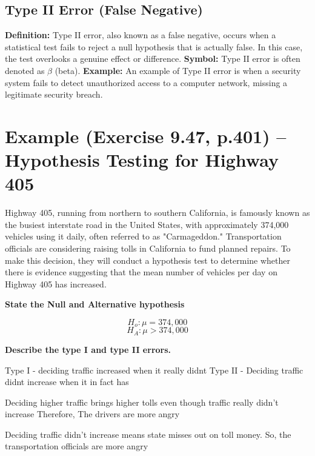 \documentclass{report}
\begin{document}
\subsection{Type II Error (False Negative)}

\vspace{10pt}
\textbf{Definition:} Type II error, also known as a false negative, occurs when a statistical test fails to reject a null hypothesis that is actually false. In this case, the test overlooks a genuine effect or difference.
\bigbreak \noindent
\textbf{Symbol:} Type II error is often denoted as $\beta$ (beta).
\bigbreak \noindent
\textbf{Example:} An example of Type II error is when a security system fails to detect unauthorized access to a computer network, missing a legitimate security breach.
  \bigbreak \noindent

  \pagebreak
\section*{Example (Exercise 9.47, p.401) – Hypothesis Testing for Highway 405}

Highway 405, running from northern to southern California, is famously known as the busiest interstate road in the United States, with approximately 374,000 vehicles using it daily, often referred to as "Carmageddon." Transportation officials are considering raising tolls in California to fund planned repairs. To make this decision, they will conduct a hypothesis test to determine whether there is evidence suggesting that the mean number of vehicles per day on Highway 405 has increased.
\bigbreak \noindent \bigbreak \noindent
\noindent \begin{large}{\textbf{State the Null and Alternative hypothesis}}\end{large}
\bigbreak \noindent
  $$ H_o : \mu = 374,000$$
  $$ H_A : \mu > 374,000$$
  \bigbreak \noindent
  \begin{large}{\textbf{Describe the type I and type II errors.}}\end{large}
  \bigbreak \noindent
  \begin{center}
  Type I - deciding traffic increased when it really didnt
\bigbreak \noindent
  Type II - Deciding traffic didnt increase when it in fact has
\end{center}
\bigbreak \noindent \bigbreak \noindent
\begin{large}{\textbf{If a type I error is committed, who is more angry?}\end{large}
  \bigbreak \noindent
  \begin{center}
  Deciding higher traffic brings higher tolls even though traffic really didn't increase
  \bigbreak \noindent
  Therefore, The drivers are more angry
\end{center}
\bigbreak \noindent
\begin{large}{\textbf{If a type II error is committed, who is more angry?}\end{large}
  \bigbreak \noindent
  \begin{center}
  Deciding traffic didn't increase means state misses out on toll money. 
\bigbreak \noindent
  So, the transportation officials are more angry
  \end{center}
\end{document}
